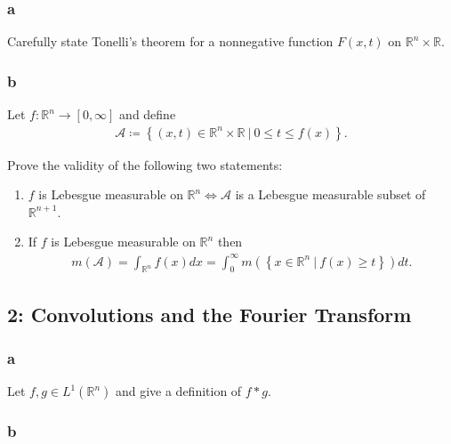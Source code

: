 \hypertarget{a-1}{%
\subsubsection{a}\label{a-1}}

Carefully state Tonelli's theorem for a nonnegative function \(F(x, t)\)
on \({\mathbb{R}}^n\times{\mathbb{R}}\).

\hypertarget{b-1}{%
\subsubsection{b}\label{b-1}}

Let \(f:{\mathbb{R}}^n\to [0, \infty]\) and define
\begin{align*} {\mathcal{A}}\coloneqq\left\{{(x, t) \in {\mathbb{R}}^n\times{\mathbb{R}}{~\mathrel{\Big|}~}0\leq t \leq f(x)}\right\} .\end{align*}

Prove the validity of the following two statements:

\begin{enumerate}
\def\labelenumi{\arabic{enumi}.}
\tightlist
\item
  \(f\) is Lebesgue measurable on
  \({\mathbb{R}}^{n} \iff {\mathcal{A}}\) is a Lebesgue measurable
  subset of \({\mathbb{R}}^{n+1}\).
\item
  If \(f\) is Lebesgue measurable on \({\mathbb{R}}^n\) then
  \begin{align*}     m(\mathcal{A})=\int_{\mathbb{R}^{n}} f(x) d x=\int_{0}^{\infty} m\left(\left\{x \in \mathbb{R}^{n}{~\mathrel{\Big|}~}f(x) \geq t\right\}\right) d t     .\end{align*}
\end{enumerate}

\hypertarget{convolutions-and-the-fourier-transform}{%
\subsection{2: Convolutions and the Fourier
Transform}\label{convolutions-and-the-fourier-transform}}

\hypertarget{a-2}{%
\subsubsection{a}\label{a-2}}

Let \(f, g\in L^1({\mathbb{R}}^n)\) and give a definition of
\(f\ast g\).

\hypertarget{b-2}{%
\subsubsection{b}\label{b-2}}

